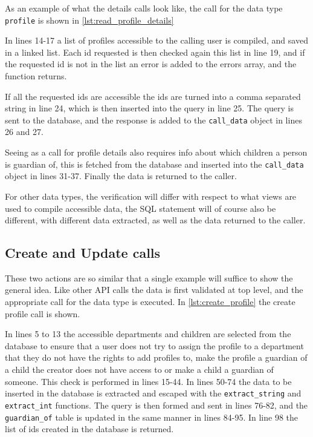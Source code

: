 As an example of what the details calls look like, the call for the data type \lstinline|profile| is shown in \autoref{lst:read_profile_details}



In lines 14-17 a list of profiles accessible to the calling user is compiled, and saved in a linked list. Each id requested is then checked again this list in line 19, and if the requested id is not in the list an error is added to the errors array, and the function returns.

If all the requested ids are accessible the ids are turned into a comma separated string in line 24, which is then inserted into the query in line 25. The query is sent to the database, and the response is added to the \lstinline|call_data| object in lines 26 and 27.

Seeing as a call for profile details also requires info about which children a person is guardian of, this is fetched from the database and inserted into the \lstinline|call_data| object in lines 31-37. Finally the data is returned to the caller.

For other data types, the verification will differ with respect to what views are used to compile accessible data, the SQL statement will of course also be different, with different data extracted, as well as the data returned to the caller.

\subsection{Create and Update calls}
These two actions are so similar that a single example will suffice to show the general idea. Like other API calls the data is first validated at top level, and the appropriate call for the data type is executed. In \autoref{lst:create_profile} the create profile call is shown.



In lines 5 to 13 the accessible departments and children are selected from the database to ensure that a user does not try to assign the profile to a department that they do not have the rights to add profiles to, make the profile a guardian of a child the creator does not have access to or make a child a guardian of someone. This check is performed in lines 15-44. In lines 50-74 the data to be inserted in the database is extracted and escaped with the \lstinline|extract_string| and \lstinline|extract_int| functions. The query is then formed and sent in lines 76-82, and the \lstinline|guardian_of| table is updated in the same manner in lines 84-95. In line 98 the list of ids created in the database is returned.


